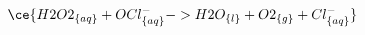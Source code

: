 \documentclass[../main.tex]{subfiles}%
\begin{document}
%
    \Xequation%
    \begin{equation}%
        \ce{H2O2_{\{aq\}} + OCl^{-}_{\{aq\}} -> H2O_{\{l\}} + O2_{\{g\}} + Cl^{-}_{\{aq\}}}%
        \label{eq:copper-etch-6}%
    \end{equation}%
\end{document}
